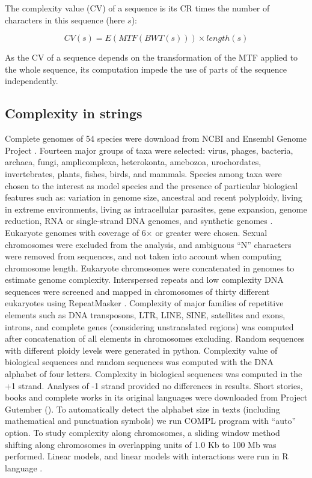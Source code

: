 The complexity value (CV) of a sequence is its CR times the number of
characters in this sequence (here $s$):

\begin{equation} \label{eq:cv}
CV(s) = E(MTF(BWT(s))) \times length(s)
\end{equation}

As the CV of a sequence depends on the transformation of the MTF applied to the whole sequence, its computation impede the use of parts of the sequence independently.

\subsection{Complexity in strings}
\label{sec:complexity-strings}

Complete genomes of 54 species were download from NCBI and Ensembl Genome Project \cite{Flicek2011}. Fourteen major groups of taxa were selected: virus, phages, bacteria, archaea, fungi, amplicomplexa, heterokonta, amebozoa, urochordates, invertebrates, plants, fishes, birds, and mammals. Species among taxa were chosen to the interest as model species and the presence of particular biological features such as: variation in genome size, ancestral and recent polyploidy, living in extreme environments, living as intracellular parasites, gene expansion, genome reduction, RNA or single-strand DNA genomes, and synthetic genomes . Eukaryote genomes with coverage of 6$\times$ or greater were chosen. Sexual chromosomes were excluded from the analysis, and ambiguous ``N'' characters were removed from sequences, and not taken into account when computing chromosome length. Eukaryote chromosomes were concatenated in genomes to estimate genome complexity. Interspersed repeats and low complexity DNA sequences were screened and mapped in chromosomes of thirty different eukaryotes using RepeatMasker \cite{Smit2010}. Complexity of major families of repetitive elements such as DNA transposons, LTR, LINE, SINE, satellites and exons, introns, and complete genes (considering unstranslated regions) was computed after concatenation of all elements in chromosomes excluding. Random sequences with different ploidy levels were generated in python. Complexity value of biological sequences and random sequences was computed with the DNA alphabet of four letters. Complexity in biological sequences was computed in the +1 strand. Analyses of -1 strand provided no differences in results. Short stories, books and complete works in its original languages were downloaded from Project Gutember (). To automatically detect the alphabet size in texts (including mathematical and punctuation symbols) we run COMPL program with ``auto'' option. To study complexity along chromosomes, a sliding window method shifting along chromosomes in overlapping units of 1.0 Kb to 100 Mb was performed. Linear models, and linear models with interactions were run in R language \cite{Team2008}.

